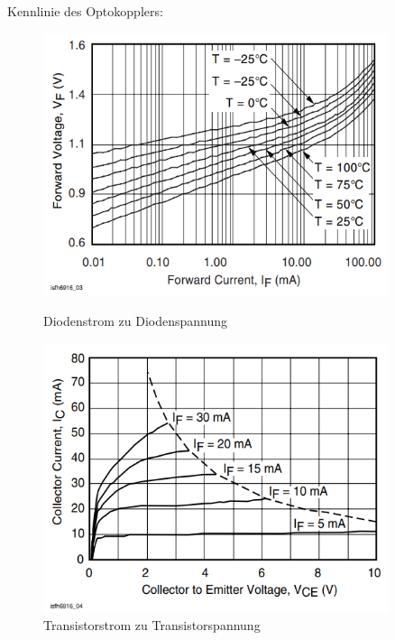 Kennlinie des Optokopplers:

\begin{figure}[H]
  \begin{minipage}[hbt]{0.45\textwidth}
    \includegraphics[width=0.9\textwidth]{Bilder/Kennlinien/Opto_Vf_If}
 	\caption{Diodenstrom zu Diodenspannung}
  	\label{Opto_Vf_If}
  \end{minipage}
\hspace{.03\linewidth}
  \begin{minipage}[hbt]{0.45\textwidth}
    \includegraphics[width=0.9\textwidth]{Bilder/Kennlinien/Opto_Vce_Ic}
  	\caption{Transistorstrom zu Transistorspannung}
  	\label{Opto_Vce_Ic}
  \end{minipage}
\end{figure}

